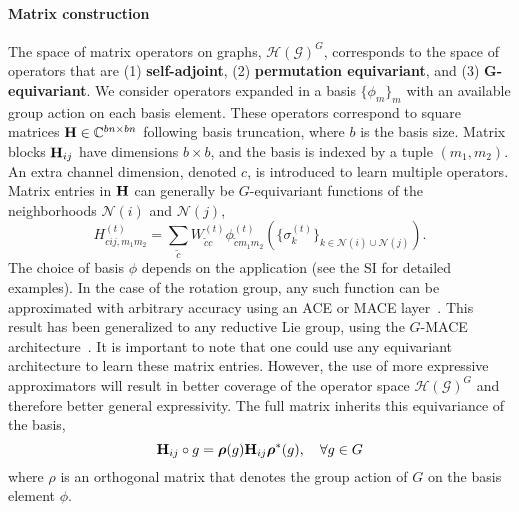 \documentclass{article} \usepackage{iclr2024_conference,times}
\def\C{\mathbb{C}}
\begin{document}
\paragraph{Matrix construction}

The space of matrix operators on graphs, $\mathcal{H}(\mathcal{G})^{G}$, corresponds to the space of operators that are (1) \textbf{self-adjoint}, (2) \textbf{permutation equivariant}, and (3) \textbf{G-equivariant}. 
We consider operators expanded in a basis $\{\phi_{m}\}_{m}$ with an available group action on each basis element. These operators correspond to square matrices ${\bf H} \in \C^{bn \times bn}$ following basis truncation, where $b$ is the basis size. Matrix blocks ${\bf H}_{ij}$ have dimensions $b \times b$, and the basis is indexed by a tuple $(m_1, m_2)$. An extra channel dimension, denoted $c$, is introduced to learn multiple operators. Matrix entries in ${\bf H}$ can generally be $G$-equivariant functions of the neighborhoods $\mathcal{N}(i)$ and $\mathcal{N}(j)$,
\begin{equation}
\label{eq:matrix-construction}
    H_{cij,m_1m_2}^{(t)} = \sum_{\tilde{c}} W_{\tilde{c}c}^{(t)} \phi_{\tilde{c}m_1m_2}^{(t)}(\{\sigma_{k}^{(t)}\}_{k \in \mathcal{N}(i) \cup \mathcal{N}(j)}).
\end{equation}
The choice of basis $\phi$ depends on the application (see the SI for detailed examples).
In the case of the rotation group, any such function can be approximated with arbitrary accuracy using an ACE or MACE layer~\citep{2021-acetb1, Batatia2022mace}.
This result has been generalized to any reductive Lie group, using the $G$-MACE architecture~\citep{batatia2023general}. It is important to note that one could use any equivariant architecture to learn these matrix entries. However, the use of more expressive approximators will result in better coverage of the operator space $\mathcal{H}(\mathcal{G})^G$ and therefore better general expressivity.
The full matrix inherits this equivariance of the basis, 
\begin{equation}
\label{eq:matrix-equivariance}
   {\bf H}_{ij} \circ g = \bm{\rho}(g) {\bf H}_{ij} \bm{\rho}^{*}(g), \quad \forall g \in G
\end{equation}
where $\rho$ is an orthogonal matrix that denotes the group action of $G$ on the basis element $\phi$.
\end{document}
